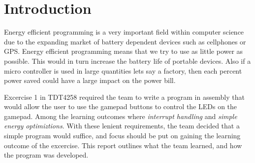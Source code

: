 \section{Introduction}
Energy efficient programming is a very important field within computer science due to the expanding market of battery dependent devices such as cellphones or GPS.
Energy efficient programming means that we try to use as little power as possible.
This would in turn increase the battery life of portable devices.
Also if a micro controller is used in large quantities lets say a factory, then each percent power saved could have a large impact on the power bill.

Excercise 1 in TDT4258 required the team to write a program in assembly that would allow the user to use the gamepad buttons to control the LEDs on the gamepad.
Among the learning outcomes where \emph{interrupt handling} and \emph{simple energy optimiztions}.
With these lenient requirements, the team decided that a simple program would suffice, and focus should be put on gaining the learning outcome of the excercise.
This report outlines what the team learned, and how the program was developed.
